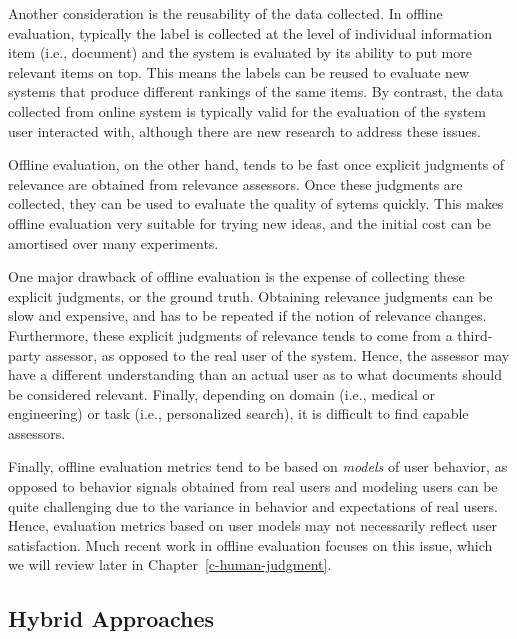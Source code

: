 Another consideration is the reusability of the data collected. In offline evaluation, typically the label is collected at the level of individual information item (i.e., document) and the system is evaluated by its ability to put more relevant items on top. This means the labels can be reused to evaluate new systems that produce different rankings of the same items. By contrast, the data collected from online system is typically valid for the evaluation of the system user interacted with, although there are new research to address these issues.

Offline evaluation, on the other hand, tends to be fast once explicit judgments of relevance are obtained from relevance assessors. Once these judgments are collected, they can be used to evaluate the quality of sytems quickly. This makes offline evaluation very suitable for trying new ideas, and the initial cost can be amortised over many experiments. %

One major drawback of offline evaluation is the expense of collecting these explicit judgments, or the ground truth. Obtaining relevance judgments can be slow and expensive, and has to be repeated if the notion of relevance changes. Furthermore, these explicit judgments of relevance tends to come from a third-party assessor, as opposed to the real user of the system. Hence, the assessor may have a different understanding than an actual user as to what documents should be considered relevant. Finally, depending on domain (i.e., medical or engineering) or task (i.e., personalized search), it is difficult to find capable assessors. 

Finally, offline evaluation metrics tend to be based on \emph{models} of user behavior, as opposed to behavior signals obtained from real users and modeling users can be quite challenging due to the variance in behavior and expectations of real users. Hence, evaluation metrics based on user models may not necessarily reflect user satisfaction. Much recent work in offline evaluation focuses on this issue, which we will review later in Chapter~\ref{c-human-judgment}. %


\subsection{Hybrid Approaches}

